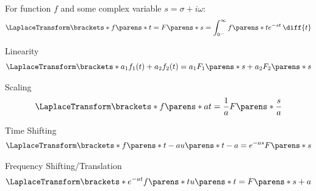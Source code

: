 \newpage
\begin{multicols}{2}

    \begin{CheatsheetEntryFrame}



    \end{CheatsheetEntryFrame}
    
    \begin{CheatsheetEntryFrameStart}


        For function $f$ and some complex variable $s = \sigma + i \omega$:
        \begin{gather*}
            \LaplaceTransform\brackets*{f\parens*{t}}
            = F\parens*{s}
            = \int_{0^-}^\infty f\parens*{t} e^{-s t} \,\diff{t}
        \end{gather*}

        \begin{center}
            Linearity
            \begin{gather*}
                \LaplaceTransform\brackets*{a_1 f_1(t) + a_2 f_2(t)}
                = a_1 F_1\parens*{s} + a_2 F_2\parens*{s}
            \end{gather*}

            Scaling
            \begin{gather*}
                \LaplaceTransform\brackets*{f\parens*{a t}}
                = \frac{1}{a} F\parens*{\frac{s}{a}}
            \end{gather*}

            Time Shifting
            \begin{gather*}
                \LaplaceTransform\brackets*{f\parens*{t - a} u\parens*{t - a}}
                = e^{-a s} F\parens*{s}
            \end{gather*}

            Frequency Shifting/Translation
            \begin{gather*}
                \LaplaceTransform\brackets*{e^{-a t} f\parens*{t} u\parens*{t}}
                = F\parens*{s + a}
            \end{gather*}


\end{center}
\end{CheatsheetEntryFrameStart}
\end{multicols}
